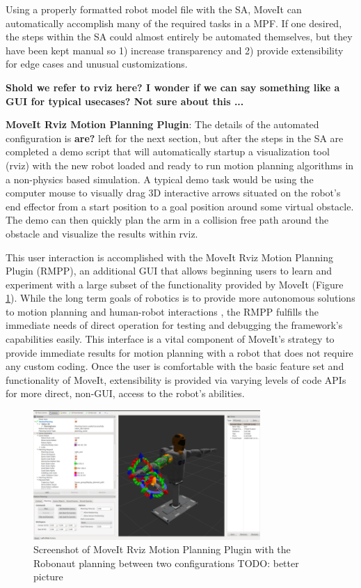 \documentclass[10pt,journal,compsoc]{joser1}
\begin{document}
{Using a properly formatted robot model file with the SA, MoveIt can automatically accomplish many of the required tasks in a MPF. If one desired, the steps within the SA could almost entirely be automated themselves, but they have been kept manual so 1) increase transparency and 2) provide extensibility for edge cases and unusual customizations.

\textbf{Shold we refer to rviz here? I wonder if we can say something like a GUI for typical usecases? Not sure about this ...}

{\bf MoveIt Rviz Motion Planning Plugin}: The details of the automated configuration is \textbf{are?} left for the next section, but after the steps in the SA are completed a demo script that will automatically startup a visualization tool (rviz) with the new robot loaded and ready to run motion planning algorithms in a non-physics based simulation. A typical demo task would be using the computer mouse to visually drag 3D interactive arrows situated on the robot's end effector from a start position to a goal position around some virtual obstacle. The demo can then quickly plan the arm in a collision free path around the obstacle and visualize the results within rviz. 

This user interaction is accomplished with the MoveIt Rviz Motion Planning Plugin (RMPP), an additional GUI that allows beginning users to learn and experiment with a large subset of the functionality provided by MoveIt (Figure \ref{fig:motionrvizplugin}). While the long term goals of robotics is to provide more autonomous solutions to motion planning and human-robot interactions \cite{yancotaxonomy}, the RMPP fulfills the immediate needs of direct operation for testing and debugging the framework's capabilities easily. This interface is a vital component of MoveIt's strategy to provide immediate results for motion planning with a robot that does not require any custom coding. Once the user is comfortable with the basic feature set and functionality of MoveIt, extensibility is provided via varying levels of code APIs for more direct, non-GUI, access to the robot's abilities.

\begin{figure}[!t]
\centering
\includegraphics[width=3.4in]{images/rviz_plugin}
\caption{Screenshot of MoveIt Rviz Motion Planning Plugin with the Robonaut planning between two configurations TODO: better picture}
\label{fig:motionrvizplugin}
\end{figure}

}
\end{document}
